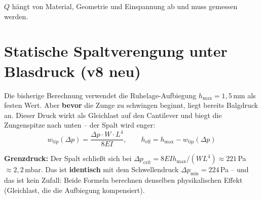 \documentclass[11pt,a4paper]{article}
\begin{document}
$Q$ hängt von Material, Geometrie und Einspannung ab und muss gemessen werden.

\section{Statische Spaltverengung unter Blasdruck (v8 neu)}

Die bisherige Berechnung verwendet die Ruhelage-Aufbiegung $h_\text{max} = 1{,}5$\,mm als festen Wert. Aber \textbf{bevor} die Zunge zu schwingen beginnt, liegt bereits Balgdruck an. Dieser Druck wirkt als Gleichlast auf den Cantilever und biegt die Zungenspitze nach unten -- der Spalt wird enger:
\begin{equation}
w_\text{tip}(\Delta p) = \frac{\Delta p \cdot W \cdot L^4}{8EI}, \qquad h_\text{eff} = h_\text{max} - w_\text{tip}(\Delta p)
\end{equation}

\begin{table}[H]
\centering\small
{}
\caption{Statische Spaltverengung unter Blasdruck (K6). Ab $\Delta p > 224$\,Pa ist der Spalt geschlossen.}
\end{table}

\begin{keybox}
\textbf{Grenzdruck:} Der Spalt schließt sich bei $\Delta p_\text{crit} = 8EIh_\text{max}/(WL^4) \approx 221$\,Pa $\approx 2{,}2$\,mbar. Das ist \textbf{identisch} mit dem Schwellendruck $\Delta p_\text{min} = 224$\,Pa -- und das ist kein Zufall: Beide Formeln berechnen denselben physikalischen Effekt (Gleichlast, die die Aufbiegung kompensiert).
\end{keybox}
\end{document}
